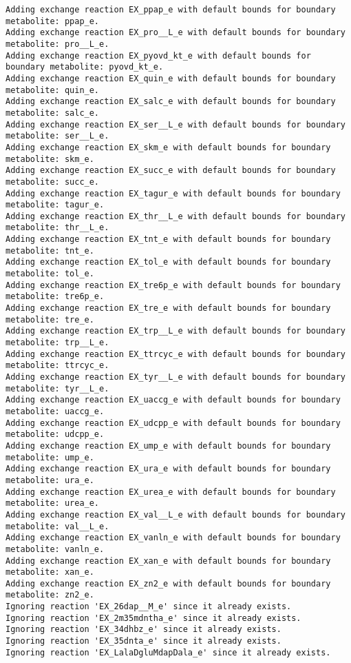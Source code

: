 \documentclass[
  letterpaper,
  DIV=11,
  numbers=noendperiod]{scrartcl}
\begin{document}
\begin{verbatim}
Adding exchange reaction EX_ppap_e with default bounds for boundary metabolite: ppap_e.
Adding exchange reaction EX_pro__L_e with default bounds for boundary metabolite: pro__L_e.
Adding exchange reaction EX_pyovd_kt_e with default bounds for boundary metabolite: pyovd_kt_e.
Adding exchange reaction EX_quin_e with default bounds for boundary metabolite: quin_e.
Adding exchange reaction EX_salc_e with default bounds for boundary metabolite: salc_e.
Adding exchange reaction EX_ser__L_e with default bounds for boundary metabolite: ser__L_e.
Adding exchange reaction EX_skm_e with default bounds for boundary metabolite: skm_e.
Adding exchange reaction EX_succ_e with default bounds for boundary metabolite: succ_e.
Adding exchange reaction EX_tagur_e with default bounds for boundary metabolite: tagur_e.
Adding exchange reaction EX_thr__L_e with default bounds for boundary metabolite: thr__L_e.
Adding exchange reaction EX_tnt_e with default bounds for boundary metabolite: tnt_e.
Adding exchange reaction EX_tol_e with default bounds for boundary metabolite: tol_e.
Adding exchange reaction EX_tre6p_e with default bounds for boundary metabolite: tre6p_e.
Adding exchange reaction EX_tre_e with default bounds for boundary metabolite: tre_e.
Adding exchange reaction EX_trp__L_e with default bounds for boundary metabolite: trp__L_e.
Adding exchange reaction EX_ttrcyc_e with default bounds for boundary metabolite: ttrcyc_e.
Adding exchange reaction EX_tyr__L_e with default bounds for boundary metabolite: tyr__L_e.
Adding exchange reaction EX_uaccg_e with default bounds for boundary metabolite: uaccg_e.
Adding exchange reaction EX_udcpp_e with default bounds for boundary metabolite: udcpp_e.
Adding exchange reaction EX_ump_e with default bounds for boundary metabolite: ump_e.
Adding exchange reaction EX_ura_e with default bounds for boundary metabolite: ura_e.
Adding exchange reaction EX_urea_e with default bounds for boundary metabolite: urea_e.
Adding exchange reaction EX_val__L_e with default bounds for boundary metabolite: val__L_e.
Adding exchange reaction EX_vanln_e with default bounds for boundary metabolite: vanln_e.
Adding exchange reaction EX_xan_e with default bounds for boundary metabolite: xan_e.
Adding exchange reaction EX_zn2_e with default bounds for boundary metabolite: zn2_e.
Ignoring reaction 'EX_26dap__M_e' since it already exists.
Ignoring reaction 'EX_2m35mdntha_e' since it already exists.
Ignoring reaction 'EX_34dhbz_e' since it already exists.
Ignoring reaction 'EX_35dnta_e' since it already exists.
Ignoring reaction 'EX_LalaDgluMdapDala_e' since it already exists.

\end{verbatim}
\end{document}
